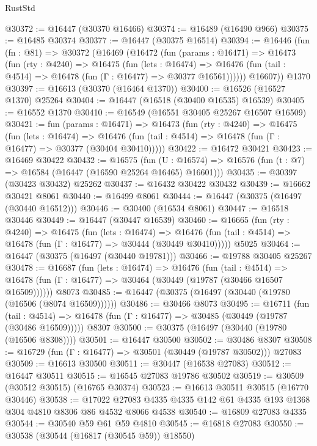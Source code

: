 \begin{lexlean}{RustStd}
\begin{coremodule}
@30372 := @16447 (@30370 @16466)
@30374 := @16489 (@16490 @966)
@30375 := @16485 @30374
@30377 := @16447 (@30375 @16514)
@30394 := @16446
    (fun (fn : @81) =>
    @30372
      (@16469
        (@16472
          (fun (params : @16471) =>
          @16473
            (fun (rty : @4240) =>
            @16475
              (fun (lets : @16474) =>
              @16476 (fun (tail : @4514) => @16478 (fun (Γ : @16477) => @30377 @16561))))))
        @16607))
    @1370
@30397 := @16613 (@30370 (@16464 @1370))
@30400 := @16526 (@16527 @1370) @25264
@30404 := @16447 (@16518 (@30400 @16535) @16539)
@30405 := @16552 @1370
@30410 := @16549 (@16551 @30405 @25267 @16507 @16509)
@30421 := fun (params : @16471) =>
  @16473
    (fun (rty : @4240) =>
    @16475
      (fun (lets : @16474) =>
      @16476 (fun (tail : @4514) => @16478 (fun (Γ : @16477) => @30377 (@30404 @30410)))))
@30422 := @16472 @30421
@30423 := @16469 @30422
@30432 := @16575
    (fun (U : @16574) => @16576 (fun (t : @7) => @16584 (@16447 (@16590 @25264 @16465) @16601)))
@30435 := @30397 (@30423 @30432) @25262
@30437 := @16432 @30422 @30432
@30439 := @16662 @30421 @8061
@30440 := @16499 @8061
@30444 := @16447 (@30375 (@16497 (@30440 @16512)))
@30446 := @30400 (@16534 @8061)
@30447 := @16518 @30446
@30449 := @16447 (@30447 @16539)
@30460 := @16665
    (fun (rty : @4240) =>
    @16475
      (fun (lets : @16474) =>
      @16476 (fun (tail : @4514) => @16478 (fun (Γ : @16477) => @30444 (@30449 @30410)))))
    @5025
@30464 := @16447 (@30375 (@16497 (@30440 @19781)))
@30466 := @19788 @30405 @25267
@30478 := @16687
    (fun (lets : @16474) =>
    @16476
      (fun (tail : @4514) =>
      @16478 (fun (Γ : @16477) => @30464 (@30449 (@19787 (@30466 @16507 @16509))))))
    @8073
@30485 := @16447 (@30375 (@16497 (@30440 (@19780 (@16506 (@8074 @16509))))))
@30486 := @30466 @8073
@30495 := @16711
    (fun (tail : @4514) => @16478 (fun (Γ : @16477) => @30485 (@30449 (@19787 (@30486 @16509)))))
    @8307
@30500 := @30375 (@16497 (@30440 (@19780 (@16506 @8308))))
@30501 := @16447 @30500
@30502 := @30486 @8307
@30508 := @16729 (fun (Γ : @16477) => @30501 (@30449 (@19787 @30502))) @27083
@30509 := @16613 @30500
@30511 := @30447 (@16538 @27083)
@30512 := @16447 @30511
@30515 := @16545 @27083 @19786 @30502
@30519 := @30509 (@30512 @30515) (@16765 @30374)
@30523 := @16613 @30511 @30515 (@16770 @30446)
@30538 := @17022 @27083 @4335 @4335 @142 @61 @4335 @193 @1368 @304 @4810 @8306 @86 @4532 @8066 @4538
@30540 := @16809 @27083 @4335
@30544 := @30540 @59 @61 @59 @4810
@30545 := @16818 @27083
@30550 := @30538 (@30544 (@16817 (@30545 @59)) @18550)

\end{coremodule}
\end{lexlean}
